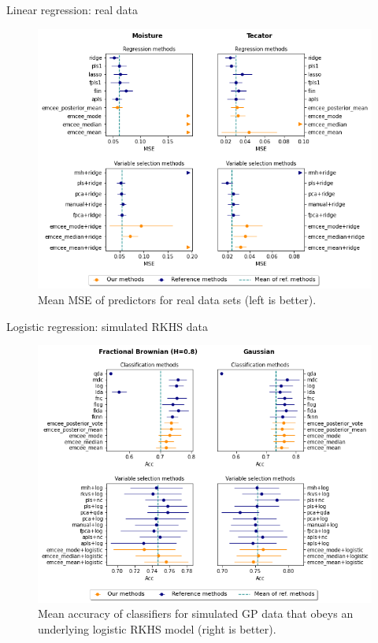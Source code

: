 \documentclass[10pt, english, professionalfonts]{beamer}
\begin{document}
\begin{frame}{Linear regression: real data}
    \vspace{1em}
  \begin{figure}
    \includegraphics[width=.75\textwidth]{img/reg_emcee_real}
    \caption{Mean MSE of predictors for real data sets (left is better).}
  \end{figure}
\end{frame}

\begin{frame}{Logistic regression: simulated RKHS data}
    \vspace{1em}
  \begin{figure}
    \includegraphics[width=.75\textwidth]{img/clf_emcee_rkhs}
    \caption{Mean accuracy of classifiers for simulated GP data that obeys an underlying logistic RKHS model (right is better).}
  \end{figure}
\end{frame}
\end{document}
